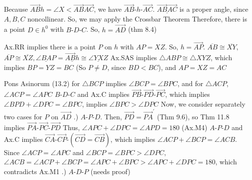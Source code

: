 \documentclass{report}
\begin{document}
\begin{itemize}
            \bigbreak \noindent 
            Because $\overrightarrow{AB}h = \angle X < \overrightarrow{AB}\overrightarrow{AC}$, we have $ \overrightarrow{AB}\text{-}h\text{-}\overrightarrow{AC} $. $\underline{\overrightarrow{AB}\overrightarrow{AC}}$ is a proper angle, since $A,B,C$ noncollinear. So, we may apply the Crossbar Theorem
            \bigbreak \noindent 
            Therefore, there is a point $D \in h^{0}$ with $ B\text{-}D\text{-}C$. So, $ h = \overrightarrow{AD} $ (thm 8.4)
            \bigbreak \noindent 
            \begin{figure}[ht]
                \centering
                \label{fig:helloworld}
            \end{figure}
            \bigbreak \noindent 
            Ax.RR implies there is a point $P$ on $h$ with $AP = XZ$. So, $h = \overrightarrow{AP}$. $\overline{AB} \cong \overline{XY}$, $\overline{AP} \cong \overline{XZ}, \underline{\angle BAP} = \underline{\overrightarrow{AB}h} \cong \underline{\angle YXZ}$
            \bigbreak \noindent 
            Ax.SAS implies $ \triangle ABP \cong \triangle XYZ $, which implies $BP = YZ = BC$ (So $P \ne D$, since $BD< BC$), and $AP = XZ = AC $
            \bigbreak \noindent 
            \begin{figure}[ht]
                \centering
                \label{fig:newtri}
            \end{figure}
            \bigbreak \noindent 
            Pons Asinorum (13.2) for $ \triangle BCP$ implies $ \angle BCP  = \angle BPC$, and for $ \triangle ACP $, $\angle ACP = \angle APC $
            \bigbreak \noindent 
            $ B\text{-}D\text{-}C$ and Ax.C implies $ \overrightarrow{PB}\text{-}\overrightarrow{PD}\text{-}\overrightarrow{PC} $, which implies $\angle BPD + \angle DPC = \angle BPC $, implies $ \angle BPC > \angle DPC $
            \bigbreak \noindent 
            Now, we consider separately two cases for $P$ on $\overrightarrow{AD}$
            \bigbreak {}.) $ A\text{-}P\text{-}D$. Then, $ \overrightarrow{PD} = \overrightarrow{PA}^{\prime}$ (Thm 9.6), so Thm 11.8 implies $ \overrightarrow{PA}\text{-}\overrightarrow{PC}\text{-}\overrightarrow{PD}$
            \bigbreak \noindent 
            Thus, $ \angle APC + \angle DPC = \angle APD = 180 $ (Ax.M4)
            \bigbreak \noindent 
            $ A\text{-}P\text{-}D $ and Ax.C implies $ \overrightarrow{CA}\text{-}\overrightarrow{CP}\text{-}\left(\overrightarrow{CD} =  \overrightarrow{CB}\right)$, which implies $ \angle ACP + \angle BCP = \angle ACB$. 
            \bigbreak \noindent 
            Since $\angle ACP = \angle APC$ and $\angle BCP = \angle BPC > \angle DPC$, $ \angle ACB = \angle ACP + \angle BCP = \angle APC + \angle BPC > \angle APC + \angle DPC = 180 $, which contradicts Ax.M1
            \bigbreak {}.) $ A\text{-}D\text{-}P$ (needs proof)







    \end{itemize}
\end{document}
